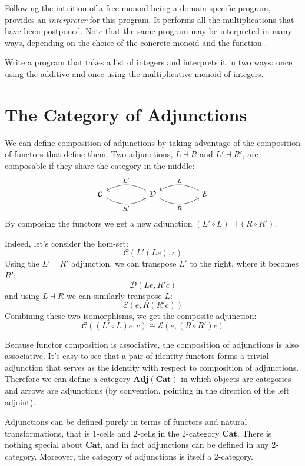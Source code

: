\documentclass[DaoFP]{subfiles}
\begin{document}
Following the intuition of a free monoid being a domain-specific program,  provides an \emph{interpreter} for this program. It performs all the multiplications that have been postponed. Note that the same program may be interpreted in many ways, depending on the choice of the concrete monoid and the function .

\begin{exercise}
Write a program that takes a list of integers and interprets it in two ways: once using the additive and once using the multiplicative monoid of integers.
\end{exercise}
\section{The Category of Adjunctions}
We can define composition of adjunctions by taking advantage of the composition of functors that define them. Two adjunctions, $L \dashv R$ and $L' \dashv R'$, are composable if they share the category in the middle:
\[
 \begin{tikzcd}
  \mathcal{C}
  \arrow[rr, bend right, "R'"']
  &&
  \mathcal{D}
  \arrow[ll, bend right, "L'"']
    \arrow[rr, bend right, "R"']
&&
  \mathcal{E}
  \arrow[ll, bend right, "L"']
 \end{tikzcd}
\]
By composing the functors we get a new adjunction $(L' \circ L) \dashv (R \circ R')$. 

Indeed, let's consider the hom-set:
\[ \mathcal{C}(L' (L e), c) \]
Using the $L' \dashv R'$ adjunction, we can transpose $L'$ to the right, where it becomes $R'$:
\[ \mathcal{D}(L e, R' c) \]
and using $L \dashv R$ we can similarly transpose $L$:
\[ \mathcal{E}( e, R(R' c)) \]
Combining these two isomorphisms, we get the composite adjunction:
\[ \mathcal{C}((L' \circ L) e, c) \cong \mathcal{E}( e, (R \circ R') c)\]

Because functor composition is associative, the composition of adjunctions is also associative. It's easy to see that a pair of identity functors forms a trivial adjunction that serves as the identity with respect to composition of adjunctions. Therefore we can define a category $\mathbf{Adj}(\mathbf{Cat})$ in which objects are categories and arrows are adjunctions (by convention, pointing in the direction of the left adjoint). 

Adjunctions can be defined purely in terms of functors and natural transformations, that is 1-cells and 2-cells in the 2-category $\mathbf{Cat}$. There is nothing special about $\mathbf{Cat}$, and in fact adjunctions can be defined in any 2-category. Moreover, the category of adjunctions is itself a 2-category.
\end{document}
